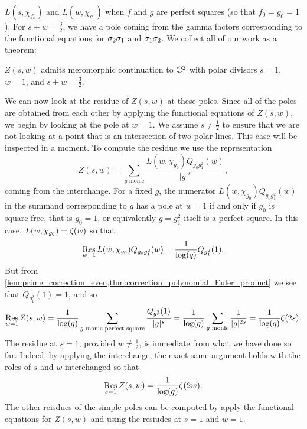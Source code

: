 \documentclass[12pt,reqno,oneside]{amsart}
\begin{document}
$L(s,\chi_{f_{0}})$ and $L(w,\chi_{g_{0}})$ when $f$ and $g$ are perfect squares (so that $f_{0} = g_{0} = 1$). For $s+w = \frac{3}{2}$, we have a pole coming from the gamma factors corresponding to the functional equations for $\sigma_{2}\sigma_{1}$ and $\sigma_{1}\sigma_{2}$. We collect all of our work as a theorem:

    \begin{theorem}
        $Z(s,w)$ admits meromorphic continuation to $\mathbb{C}^{2}$ with polar divisors $s = 1$, $w = 1$, and $s+w = \frac{3}{2}$.
    \end{theorem}

    We can now look at the residue of $Z(s,w)$ at these poles. Since all of the poles are obtained from each other by applying the functional equations of $Z(s,w)$, we begin by looking at the pole at $w = 1$. We assume $s \neq \frac{1}{2}$ to ensure that we are not looking at a point that is an intersection of two polar lines. This case will be inspected in a moment. To compute the residue we use the representation
    \[
        Z(s,w) = \sum_{\text{$g$ monic}}\frac{L(w,\chi_{g_{0}})Q_{g_{0}g_{1}^{2}}(w)}{|g|^{s}},
    \]
    coming from the interchange. For a fixed $g$, the numerator $L(w,\chi_{g_{0}})Q_{g_{0}g_{1}^{2}}(w)$ in the summand corresponding to $g$ has a pole at $w = 1$ if and only if $g_{0}$ is square-free, that is $g_{0} = 1$, or equivalently $g = g_{1}^{2}$ itself is a perfect square. In this case, $L(w,\chi_{g_{0}}) = \zeta(w)$ so that
    \[
        \operatorname*{\mathrm{Res}}_{w = 1}L(w,\chi_{g_{0}})Q_{g_{0}g_{1}^{2}}(w) = \frac{1}{\log(q)}Q_{g_{1}^{2}}(1).
    \]
    But from \cref{lem:prime_correction_even,thm:correction_polynomial_Euler_product} we see that $Q_{g_{1}^{2}}(1) = 1$, and so
    \[
        \operatorname*{\mathrm{Res}}_{w = 1}Z(s,w) = \frac{1}{\log(q)}\sum_{\text{$g$ monic perfect square}}\frac{Q_{g_{1}^{2}}(1)}{|g|^{s}} = \frac{1}{\log(q)}\sum_{\text{$g$ monic}}\frac{1}{|g|^{2s}} = \frac{1}{\log(q)}\zeta(2s).
    \]
    The residue at $s = 1$, provided $w \neq \frac{1}{2}$, is immediate from what we have done so far. Indeed, by applying the interchange, the exact same argument holds with the roles of $s$ and $w$ interchanged so that
    \[
        \operatorname*{\mathrm{Res}}_{s = 1}Z(s,w) = \frac{1}{\log(q)}\zeta(2w).
    \]
    The other reisdues of the simple poles can be computed by apply the functional equations for $Z(s,w)$ and using the resiudes at $s = 1$ and $w = 1$.
\end{document}
